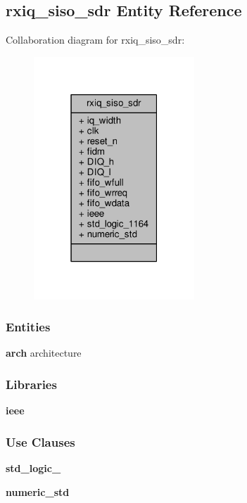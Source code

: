\subsection{rxiq\+\_\+siso\+\_\+sdr Entity Reference}
\label{classrxiq__siso__sdr}


Collaboration diagram for rxiq\+\_\+siso\+\_\+sdr\+:\nopagebreak
\begin{figure}[H]
\begin{center}
\leavevmode
\includegraphics[width=171pt]{d4/da7/classrxiq__siso__sdr__coll__graph}
\end{center}
\end{figure}
\subsubsection*{Entities}
\begin{DoxyCompactItemize}
\item 
{\bf arch} architecture
\end{DoxyCompactItemize}
\subsubsection*{Libraries}
 \begin{DoxyCompactItemize}
\item 
{\bf ieee} 
\end{DoxyCompactItemize}
\subsubsection*{Use Clauses}
 \begin{DoxyCompactItemize}
\item 
{\bf std\+\_\+logic\+\_}   
\item 
{\bf numeric\+\_\+std}   
\end{DoxyCompactItemize}
